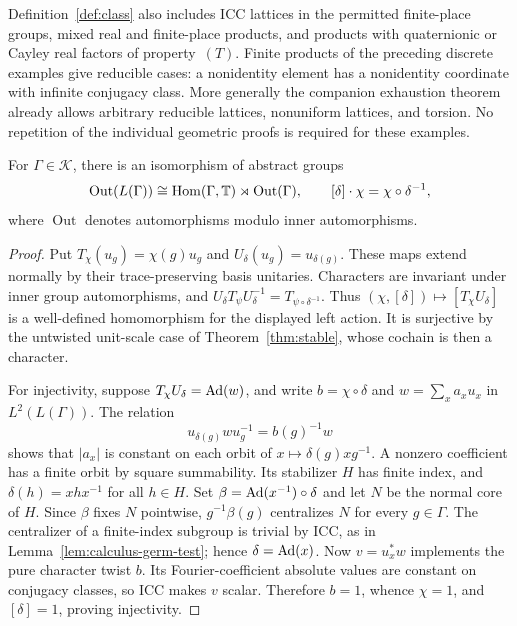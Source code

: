 Definition~\ref{def:class} also includes ICC lattices in the permitted
finite-place groups, mixed real and finite-place products, and products
with quaternionic or Cayley real factors of property~$(T)$. Finite
products of the preceding discrete examples give reducible cases:
a nonidentity element has a nonidentity coordinate with infinite
conjugacy class. More generally the companion exhaustion theorem already
allows arbitrary reducible lattices, nonuniform lattices, and torsion.
No repetition of the individual geometric proofs is required for these
examples.

\begin{corollary}\label{cor:outer-automorphisms}
For $\Gamma\in\mathscr K$, there is an isomorphism of abstract groups
\[
 \operatorname{Out}(L(\Gamma))
 \cong\operatorname{Hom}(\Gamma,\mathbb T)\rtimes\operatorname{Out}(\Gamma),
 \qquad [\delta]\cdot\chi=\chi\circ\delta^{-1},
\]
where $\operatorname{Out}$ denotes automorphisms modulo inner
automorphisms.
\end{corollary}
\begin{proof}
Put $T_\chi(u_g)=\chi(g)u_g$ and $U_\delta(u_g)=u_{\delta(g)}$.
These maps extend normally by their trace-preserving basis unitaries.
Characters are invariant under inner group automorphisms, and
$U_\delta T_\psi U_\delta^{-1}=T_{\psi\circ\delta^{-1}}$.
Thus $(\chi,[\delta])\mapsto[T_\chi U_\delta]$ is a well-defined
homomorphism for the displayed left action. It is surjective by the
untwisted unit-scale case of Theorem~\ref{thm:stable}, whose cochain
is then a character.

For injectivity, suppose $T_\chi U_\delta=\operatorname{Ad}(w)$, and write
$b=\chi\circ\delta$ and $w=\sum_x a_xu_x$ in $L^2(L(\Gamma))$.
The relation
\[
 u_{\delta(g)}wu_g^{-1}=b(g)^{-1}w
\]
shows that $|a_x|$ is constant on each orbit of
$x\mapsto\delta(g)xg^{-1}$. A nonzero coefficient has a finite orbit
by square summability. Its stabilizer $H$ has finite index, and
$\delta(h)=xhx^{-1}$ for all $h\in H$.
Set $\beta=\operatorname{Ad}(x^{-1})\circ\delta$ and let $N$ be the normal core
of $H$. Since $\beta$ fixes $N$ pointwise,
$g^{-1}\beta(g)$ centralizes $N$ for every $g\in\Gamma$.
The centralizer of a finite-index subgroup is trivial by ICC, as in
Lemma~\ref{lem:calculus-germ-test}; hence $\delta=\operatorname{Ad}(x)$.
Now $v=u_x^*w$ implements the pure character twist $b$.
Its Fourier-coefficient absolute values are constant on conjugacy
classes, so ICC makes $v$ scalar. Therefore $b=1$, whence $\chi=1$,
and $[\delta]=1$, proving injectivity.
\end{proof}

